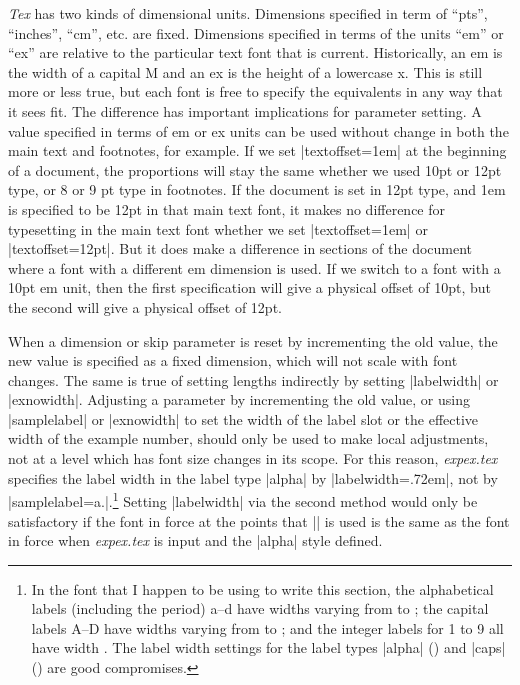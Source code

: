 {\it Tex\/} has two kinds of dimensional units.  Dimensions
specified in term of ``pts'', ``inches'', ``cm'', etc. are fixed.
Dimensions specified in terms of the units ``em'' or ``ex'' are
relative to the particular text font that is current.
Historically, an em is the width of a capital M and an ex is the
height of a lowercase x.  This is still more or less true, but
each font is free to specify the equivalents in any way that it
sees fit.  The difference has important implications for
parameter setting.  A value specified in terms of em or ex units
can be used without change in both the main text and footnotes,
for example.  If we set |textoffset=1em| at the beginning of a
document, the proportions will stay the same whether we used 10pt
or 12pt type, or 8 or 9 pt type in footnotes.
If the document is set in 12pt type, and 1em is specified to be
12pt in that main text font, it makes no difference for
typesetting in the main text font whether we set |textoffset=1em|
or |textoffset=12pt|.  But it does make a difference in sections
of the document where a font with a different em dimension is
used.  If we switch to a font with a 10pt em unit, then the first
specification will give a physical offset of 10pt, but the second
will give a physical offset of 12pt.

When a dimension or skip parameter is reset by incrementing the old
value, the new value is specified as a fixed dimension, which will
not scale with font changes.  The same is true of setting lengths
indirectly by setting |labelwidth| or |exnowidth|.  Adjusting a
parameter by incrementing the old value, or using |samplelabel|
or |exnowidth| to set the width of the label slot or the
effective width of the example number, should only be used to
make local adjustments, not at a level which has font size
changes in its scope.  For this reason, {\sl expex.tex\/}
specifies the label width in the label type |alpha| by
|labelwidth=.72em|, not by |samplelabel=a.|.\footnote{%
In the font
that I happen to be using to write this section, the alphabetical
labels (including the period) a--d have widths varying from
\textdim{.694 em} to \textdim{.75 em}; the capital labels A--D
have widths varying from \textdim{.917 em} to \textdim{.972 em};
and the integer labels for 1 to 9 all have width \textdim{.75
em}. The label width settings for the label types |alpha|
(\textdim{.72 em}) and |caps| (\textdim{.94 em}) are good
compromises.}
Setting |labelwidth| via the second method would only be
satisfactory if the font in force at the points that |\pex| is
used is the same as the font in force when {\sl expex.tex\/} is
input and the |alpha| style defined.

